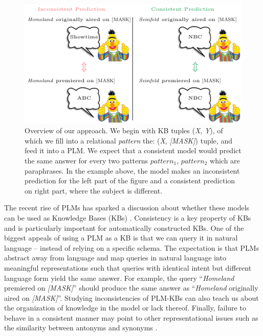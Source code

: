 \begin{figure}[t!]
\centering

\includegraphics[width=1.\columnwidth]{figures/overview}

\caption{Overview of our approach. We begin with KB tuples (\textit{X}, \textit{Y}), of which we fill into a relational \textit{pattern} the: (\textit{X}, \textit{[MASK]}) tuple,
and feed it into a PLM. 
We expect that a consistent model would predict the same answer for every two patterns $pattern_1$, $pattern_2$ which are paraphrases. 
In the example above, the model makes an inconsistent prediction for the left part of the figure and a consistent prediction on right part, where the subject is different.}
\label{fig:overview}
\end{figure}


The recent rise of PLMs has sparked a discussion about whether these models can be used as Knowledge Bases (KBs) \cite{lama,petroni2020how,alpaqa,roberts2020much}. 
Consistency is a key property of KBs and is particularly important for automatically constructed KBs.
One of the biggest appeals of using a PLM as a KB is that we can
query it in natural language -- instead of relying on a specific schema.
The expectation is that PLMs abstract away from language and map queries in natural language into meaningful representations such that queries with identical intent but different language form yield the same answer. 
For example, the query ``\textit{Homeland} premiered on \textit{[MASK]}'' should produce the same answer as ``\textit{Homeland} originally aired on \textit{[MASK]}''.
Studying inconsistencies of PLM-KBs can also teach us about the organization of knowledge in the model or lack thereof. 
Finally, failure to behave in a consistent manner may point
to other representational issues
such as the similarity between antonyms and synonyms
\cite{nguyen2016integrating}.

